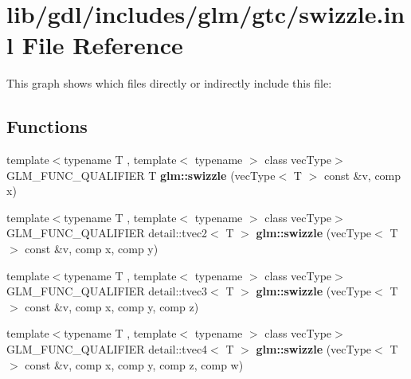 \hypertarget{swizzle_8inl}{}\section{lib/gdl/includes/glm/gtc/swizzle.inl File Reference}
\label{swizzle_8inl}
This graph shows which files directly or indirectly include this file\+:
\subsection*{Functions}
\begin{DoxyCompactItemize}
\item 
\hypertarget{group__gtc__swizzle_ga09b6f795bc75d7fa47085a715eb636c9}{}{\footnotesize template$<$typename T , template$<$ typename $>$ class vec\+Type$>$ }\\G\+L\+M\+\_\+\+F\+U\+N\+C\+\_\+\+Q\+U\+A\+L\+I\+F\+I\+E\+R T {\bfseries glm\+::swizzle} (vec\+Type$<$ T $>$ const \&v, comp x)\label{group__gtc__swizzle_ga09b6f795bc75d7fa47085a715eb636c9}

\item 
\hypertarget{group__gtc__swizzle_ga9eba89cade1f01221e5f4dc019b00245}{}{\footnotesize template$<$typename T , template$<$ typename $>$ class vec\+Type$>$ }\\G\+L\+M\+\_\+\+F\+U\+N\+C\+\_\+\+Q\+U\+A\+L\+I\+F\+I\+E\+R detail\+::tvec2$<$ T $>$ {\bfseries glm\+::swizzle} (vec\+Type$<$ T $>$ const \&v, comp x, comp y)\label{group__gtc__swizzle_ga9eba89cade1f01221e5f4dc019b00245}

\item 
\hypertarget{group__gtc__swizzle_gabf0ce6dc9ee0b7d6327e211760bb9d20}{}{\footnotesize template$<$typename T , template$<$ typename $>$ class vec\+Type$>$ }\\G\+L\+M\+\_\+\+F\+U\+N\+C\+\_\+\+Q\+U\+A\+L\+I\+F\+I\+E\+R detail\+::tvec3$<$ T $>$ {\bfseries glm\+::swizzle} (vec\+Type$<$ T $>$ const \&v, comp x, comp y, comp z)\label{group__gtc__swizzle_gabf0ce6dc9ee0b7d6327e211760bb9d20}

\item 
\hypertarget{group__gtc__swizzle_ga54740b832c0d65da8ca7c682d50f4ae5}{}{\footnotesize template$<$typename T , template$<$ typename $>$ class vec\+Type$>$ }\\G\+L\+M\+\_\+\+F\+U\+N\+C\+\_\+\+Q\+U\+A\+L\+I\+F\+I\+E\+R detail\+::tvec4$<$ T $>$ {\bfseries glm\+::swizzle} (vec\+Type$<$ T $>$ const \&v, comp x, comp y, comp z, comp w)\label{group__gtc__swizzle_ga54740b832c0d65da8ca7c682d50f4ae5}


\end{DoxyCompactItemize}
